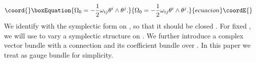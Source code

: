 \documentclass[10pt,a4paper]{article}
\begin{document}
\begin{equation}\coord{}\boxEquation{
\Omega_0=-{1\over2}\omega_{ij}\theta^i\wedge\theta^j.
}{
\Omega_0=-{1\over2}\omega_{ij}\theta^i\wedge\theta^j.
}{ecuacion}\coordE{}\end{equation}
We identify \coordHE{} with the symplectic form on \coordHE{}, so that it should be closed \coordHE{}. For fixed \myHighlight{$\omega$}\coordHE{}, we will use \myHighlight{$\theta$}\coordHE{} to vary a symplectic structure on \coordHE{}.
We further introduce a complex vector bundle \coordHE{} with a connection \coordHE{} and its coefficient bundle \coordHE{} over \coordHE{}. In this paper we treat \coordHE{} as \coordHE{} gauge bundle for simplicity.\\
\end{document}
